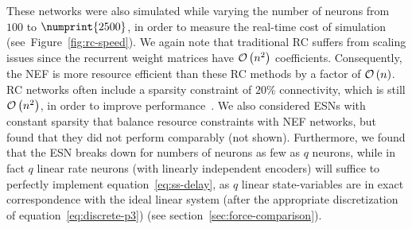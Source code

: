 These networks were also simulated while varying the number of neurons from $100$ to $\numprint{2500}$, in order to measure the real-time cost of simulation (see~Figure~\ref{fig:rc-speed}).
We again note that traditional RC suffers from scaling issues since the recurrent weight matrices have $\mathcal{O}\left({ n^2 }\right)$ coefficients.
Consequently, the NEF is more resource efficient than these RC methods by a factor of $\mathcal{O}\left({ n }\right)$.
RC networks often include a sparsity constraint of $20\%$ connectivity, which is still $\mathcal{O}\left({n^2}\right)$, in order to improve performance~\citep{lukovsevivcius2012practical, lukovsevicius2012reservoir}.
We also considered ESNs with constant sparsity that balance resource constraints with NEF networks, but found that they did not perform comparably (not shown).
Furthermore, we found that the ESN breaks down for numbers of neurons as few as $q$ neurons, while in fact $q$ linear rate neurons (with linearly independent encoders) will suffice to perfectly implement equation~\ref{eq:ss-delay}, as $q$ linear state-variables are in exact correspondence with the ideal linear system (after the appropriate discretization of equation~\ref{eq:discrete-p3}) (see section~\ref{sec:force-comparison}).


